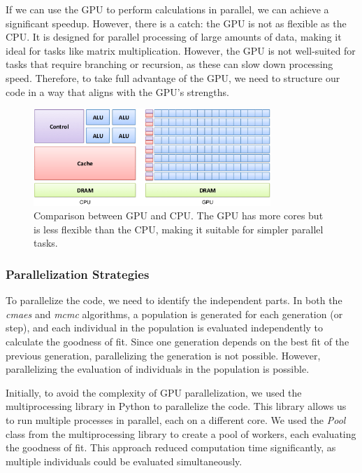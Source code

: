 \medskip

If we can use the GPU to perform calculations in parallel, we can achieve a significant speedup. However, there is a catch: the GPU is not as flexible as the CPU. It is designed for parallel processing of large amounts of data, making it ideal for tasks like matrix multiplication. However, the GPU is not well-suited for tasks that require branching or recursion, as these can slow down processing speed. Therefore, to take full advantage of the GPU, we need to structure our code in a way that aligns with the GPU's strengths.

\medskip

\begin{figure}[h]
    \centering
    \includegraphics[width=0.8\textwidth]{images/gpu_vs_cpu.png}
    \caption{Comparison between GPU and CPU. The GPU has more cores but is less flexible than the CPU, making it suitable for simpler parallel tasks. \cite{gpu_vs_cpu}}
\end{figure}

\subsubsection{Parallelization Strategies}

To parallelize the code, we need to identify the independent parts. In both the \textit{cmaes} and \textit{mcmc} algorithms, a population is generated for each generation (or step), and each individual in the population is evaluated independently to calculate the goodness of fit. Since one generation depends on the best fit of the previous generation, parallelizing the generation is not possible. However, parallelizing the evaluation of individuals in the population is possible.

\medskip

Initially, to avoid the complexity of GPU parallelization, we used the multiprocessing library in Python to parallelize the code. This library allows us to run multiple processes in parallel, each on a different core. We used the \textit{Pool} class from the multiprocessing library to create a pool of workers, each evaluating the goodness of fit. This approach reduced computation time significantly, as multiple individuals could be evaluated simultaneously.

